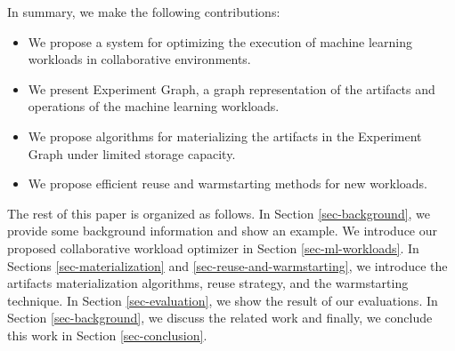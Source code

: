 In summary, we make the following contributions:
\begin{itemize}
\item We propose a system for optimizing the execution of machine learning workloads in collaborative environments.
\item We present Experiment Graph, a graph representation of the artifacts and operations of the machine learning workloads.
\item We propose algorithms for materializing the artifacts in the Experiment Graph under limited storage capacity.
\item We propose efficient reuse and warmstarting methods for new workloads.
\end{itemize}

The rest of this paper is organized as follows.
In Section \ref{sec-background}, we provide some background information and show an example.
We introduce our proposed collaborative workload optimizer in Section \ref{sec-ml-workloads}.
In Sections \ref{sec-materialization} and \ref{sec-reuse-and-warmstarting}, we introduce the artifacts materialization algorithms, reuse strategy, and the warmstarting technique. 
In Section \ref{sec-evaluation}, we show the result of our evaluations.
In Section \ref{sec-background}, we discuss the related work and finally, we conclude this work in Section \ref{sec-conclusion}.